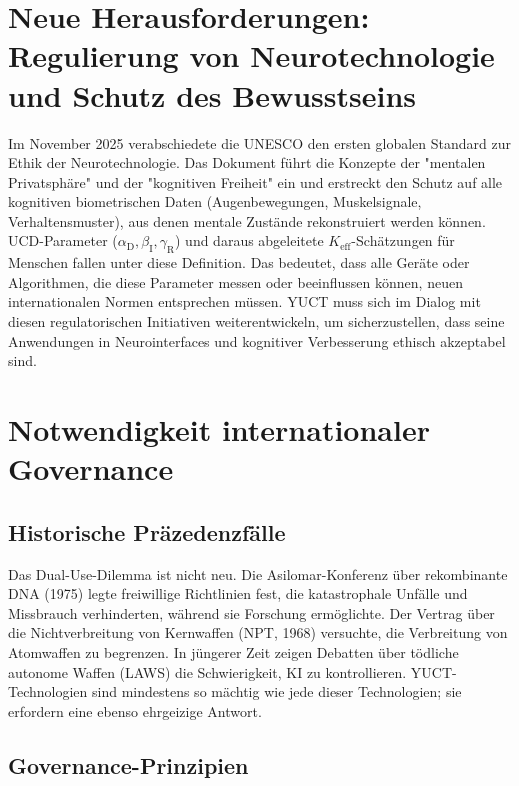 \documentclass[12pt,a4paper]{article}
\theoremstyle{remark}
\newcommand{\Keff}{K_{\mathrm{eff}}}
\newcommand{\alD}{\alpha_{\mathrm{D}}}
\newcommand{\beI}{\beta_{\mathrm{I}}}
\newcommand{\gaR}{\gamma_{\mathrm{R}}}
\begin{document}
	\section{Neue Herausforderungen: Regulierung von Neurotechnologie und Schutz des Bewusstseins}
	\label{sec:neuroethics}
	
	Im November 2025 verabschiedete die UNESCO den ersten globalen Standard zur Ethik der Neurotechnologie. Das Dokument führt die Konzepte der "mentalen Privatsphäre" und der "kognitiven Freiheit" ein und erstreckt den Schutz auf alle kognitiven biometrischen Daten (Augenbewegungen, Muskelsignale, Verhaltensmuster), aus denen mentale Zustände rekonstruiert werden können. UCD-Parameter (\(\alD,\beI,\gaR\)) und daraus abgeleitete \(\Keff\)-Schätzungen für Menschen fallen unter diese Definition. Das bedeutet, dass alle Geräte oder Algorithmen, die diese Parameter messen oder beeinflussen können, neuen internationalen Normen entsprechen müssen. YUCT muss sich im Dialog mit diesen regulatorischen Initiativen weiterentwickeln, um sicherzustellen, dass seine Anwendungen in Neurointerfaces und kognitiver Verbesserung ethisch akzeptabel sind.
	
	\section{Notwendigkeit internationaler Governance}
	\label{sec:governance}
	
	\subsection{Historische Präzedenzfälle}
	\label{subsec:precedents}
	
	Das Dual-Use-Dilemma ist nicht neu. Die Asilomar-Konferenz über rekombinante DNA (1975) legte freiwillige Richtlinien fest, die katastrophale Unfälle und Missbrauch verhinderten, während sie Forschung ermöglichte. Der Vertrag über die Nichtverbreitung von Kernwaffen (NPT, 1968) versuchte, die Verbreitung von Atomwaffen zu begrenzen. In jüngerer Zeit zeigen Debatten über tödliche autonome Waffen (LAWS) die Schwierigkeit, KI zu kontrollieren. YUCT-Technologien sind mindestens so mächtig wie jede dieser Technologien; sie erfordern eine ebenso ehrgeizige Antwort.
	
	\subsection{Governance-Prinzipien}
	\label{subsec:principles}
	
\end{document}
